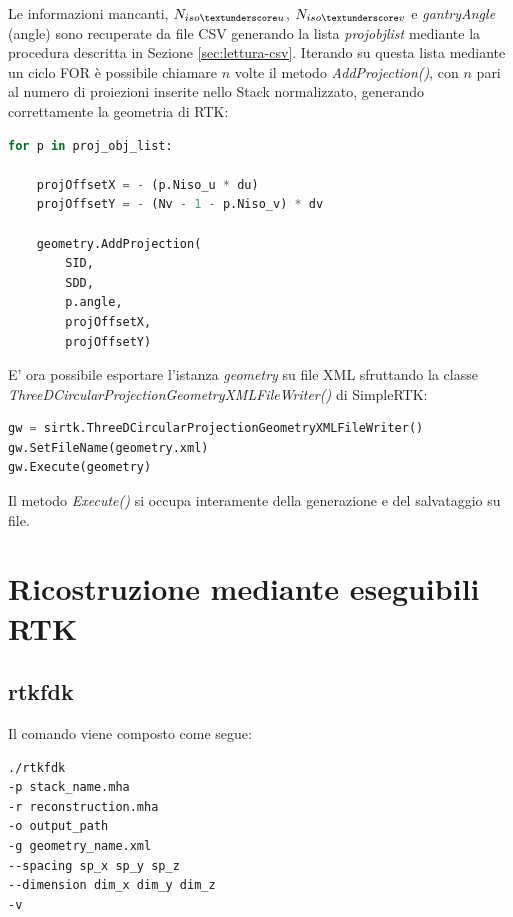 \documentclass[a4paper,12pt, doubleside]{report}
\begin{document}
                    Le informazioni mancanti, $N_{iso\textunderscore u}$, $N_{iso\textunderscore v}$ e \textit{gantryAngle} (angle) sono recuperate da file CSV generando la lista \textit{proj\textunderscore obj\textunderscore list} mediante la procedura descritta in Sezione \ref{sec:lettura-csv}. Iterando su questa lista mediante un ciclo FOR è possibile chiamare $n$ volte il metodo \textit{AddProjection()}, con $n$ pari al numero di proiezioni inserite nello Stack normalizzato, generando correttamente la geometria di RTK:
                    
                    \begin{lstlisting}[language=python, frame=bt]
for p in proj_obj_list: 

    projOffsetX = - (p.Niso_u * du)
    projOffsetY = - (Nv - 1 - p.Niso_v) * dv

    geometry.AddProjection(
        SID,
        SDD,
        p.angle,
        projOffsetX,
        projOffsetY)
                    \end{lstlisting}
                    
                    E' ora possibile esportare l'istanza \textit{geometry} su file XML sfruttando la classe \textit{ThreeDCircularProjectionGeometryXMLFileWriter()} di SimpleRTK:
                    
                    \begin{lstlisting}[language=python, frame=bt]
gw = sirtk.ThreeDCircularProjectionGeometryXMLFileWriter()
gw.SetFileName(geometry.xml)
gw.Execute(geometry)
                    \end{lstlisting}
       
                    Il metodo \textit{Execute()} si occupa interamente della generazione e del salvataggio su file.
                    
            
        \section{Ricostruzione mediante eseguibili RTK}
            \subsection{rtkfdk}
                \par
                    Il comando viene composto come segue:
                    \begin{lstlisting}[language=bash, frame=bt]
./rtkfdk 
-p stack_name.mha 
-r reconstruction.mha
-o output_path 
-g geometry_name.xml 
--spacing sp_x sp_y sp_z 
--dimension dim_x dim_y dim_z 
-v
                    \end{lstlisting}
            
\end{document}
